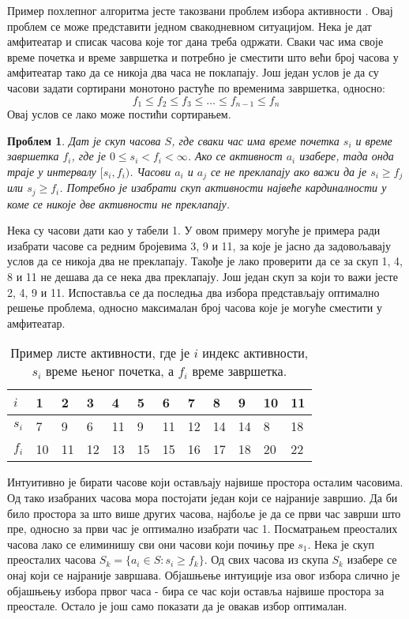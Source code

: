 \documentclass[a4paper, 12pt, ngerman]{article}
\newtheorem{problem}{Проблем}
\begin{document}
Пример похлепног алгоритма јесте такозвани проблем избора активности \cite{clrs}. Овај проблем се може представити једном свакодневном ситуацијом. Нека је дат амфитеатар и списак часова које тог дана треба одржати. Сваки час има своје време почетка и време завршетка и потребно је сместити што већи број часова у амфитеатар тако да се никоја два часа не поклапају. Још један услов је да су часови задати сортирани монотоно растуће по временима завршетка, односно: 
$$ f_1 \le f_2 \le f_3 \le \ldots \le f_{n-1} \le f_n$$
Овај услов се лако може постићи сортирањем.

\begin{problem}
Дат је скуп часова $S$, где сваки час има време почетка $s_i$ и време завршетка $f_i$, где је $0 \le s_i < f_i < \infty$. Ако се активност $a_i$ изабере, тада онда траје у интервалу $[s_i, f_i)$. Часови $a_i$ и $a_j$ се не преклапају ако важи да је $s_i \ge f_j$ или $s_j \ge f_i$. Потребно је изабрати скуп активности највеће кардиналности у коме се никоје две активности не преклапају.
\end{problem}

Нека су часови дати као у табели 1. У овом примеру могуће је примера ради изабрати часове са редним бројевима 3, 9 и 11, за које је јасно да задовољавају услов да се никоја два не преклапају. Такође је лако проверити да се за скуп 1, 4, 8 и 11 не дешава да се нека два преклапају. Још један скуп за који то важи јесте 2, 4, 9 и 11. Испоставља се да последња два избора представљају оптимално решење проблема, односно максималан број часова које је могуће сместити у амфитеатар.

\begin{table}[htbp]
\begin{tabularx}{\textwidth}{lXXXXXXXXXXX}
	$i$   & 1 & 2 & 3 & 4 & 5 & 6 & 7 & 8 & 9 & 10 & 11 \\
	\hline
	$s_i$ & 7 & 9 & 6 & 11 & 9 & 11 & 12 & 14 & 14 & 8  & 18 \\
	$f_i$ & 10 & 11 & 12 & 13 & 15 & 15 & 16 & 17 & 18 & 20 & 22 \\
\end{tabularx}
\caption{Пример листе активности, где је $i$ индекс активности, $s_i$ време њеног почетка, а $f_i$ време завршетка.}
\end{table}

Интуитивно је бирати часове који остављају највише простора осталим часовима. Од тако изабраних часова мора постојати један који се најраније завршио. Да би било простора за што више других часова, најбоље је да се први час заврши што пре, односно за први час је оптимално изабрати час 1. Посматрањем преосталих часова лако се елиминишу сви они часови који почињу пре $s_1$. Нека је скуп преосталих часова $S_k = \{a_i \in S : s_i \ge f_k\}$. Од свих часова из скупа $S_k$ изабере се онај који се најраније завршава. Објашњење интуиције иза овог избора слично је објашњењу избора првог часа - бира се час који оставља највише простора за преостале. Остало је још само показати да је овакав избор оптималан.
\end{document}
